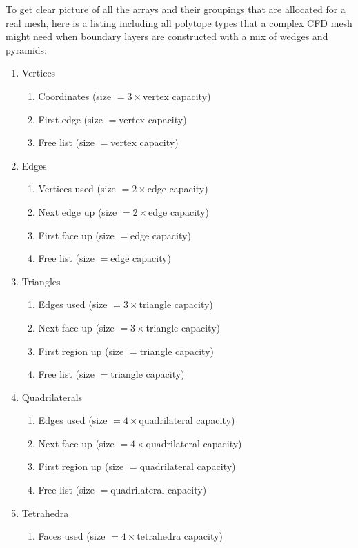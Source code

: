 To get clear picture of all the arrays and their groupings
that are allocated for a real mesh, here is a listing
including all polytope types that a complex CFD mesh
might need when boundary layers are constructed with
a mix of wedges and pyramids:

\begin{enumerate}
\item Vertices
  \begin{enumerate}
  \item Coordinates (size $=3\times$vertex capacity)
  \item First edge (size $=$vertex capacity)
  \item Free list (size $=$vertex capacity)
  \end{enumerate}
\item Edges
  \begin{enumerate}
  \item Vertices used (size $=2\times$edge capacity)
  \item Next edge up (size $=2\times$edge capacity)
  \item First face up (size $=$edge capacity)
  \item Free list (size $=$edge capacity)
  \end{enumerate}
\item Triangles
  \begin{enumerate}
  \item Edges used (size $=3\times$triangle capacity)
  \item Next face up (size $=3\times$triangle capacity)
  \item First region up (size $=$triangle capacity)
  \item Free list (size $=$triangle capacity)
  \end{enumerate}
\item Quadrilaterals
  \begin{enumerate}
  \item Edges used (size $=4\times$quadrilateral capacity)
  \item Next face up (size $=4\times$quadrilateral capacity)
  \item First region up (size $=$quadrilateral capacity)
  \item Free list (size $=$quadrilateral capacity)
  \end{enumerate}
\item Tetrahedra
  \begin{enumerate}
  \item Faces used (size $=4\times$tetrahedra capacity)

\end{enumerate}
\end{enumerate}
